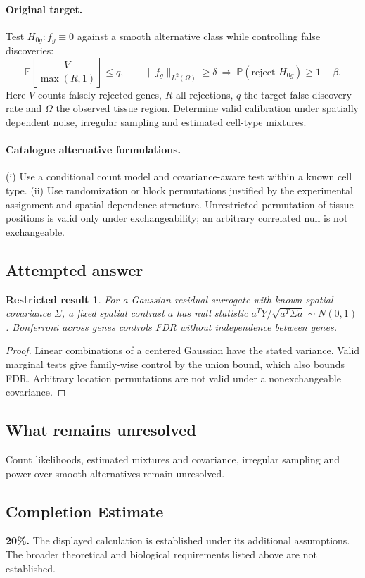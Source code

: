\documentclass[11pt]{article}
\newcommand{\E}{\mathbb E}
\newcommand{\Prob}{\mathbb P}
\providecommand{\E}{\mathbb E}
\providecommand{\Prob}{\mathbb P}
\newtheorem{attemptresult}{Restricted result}[section]
\begin{document}
\paragraph{Original target.}
Test $H_{0g}:f_g\equiv0$ against a smooth alternative class while controlling false discoveries:
\[\E\!\left[\frac{V}{\max(R,1)}\right]\le q,\qquad \|f_g\|_{L^2(\Omega)}\ge\delta\ \Longrightarrow\ \Prob(\text{reject }H_{0g})\ge1-\beta.\]
Here $V$ counts falsely rejected genes, $R$ all rejections, $q$ the target false-discovery rate and $\Omega$ the observed tissue region. Determine valid calibration under spatially dependent noise, irregular sampling and estimated cell-type mixtures.
\paragraph{Catalogue alternative formulations.}
(i) Use a conditional count model and covariance-aware test within a known cell type. (ii) Use randomization or block permutations justified by the experimental assignment and spatial dependence structure. Unrestricted permutation of tissue positions is valid only under exchangeability; an arbitrary correlated null is not exchangeable.
\subsection{Attempted answer}
\begin{attemptresult}
For a Gaussian residual surrogate with known spatial covariance $\Sigma$, a fixed spatial contrast $a$ has null statistic $a^TY/\sqrt{a^T\Sigma a}\sim N(0,1)$. Bonferroni across genes controls FDR without independence between genes.
\end{attemptresult}
\begin{proof}
Linear combinations of a centered Gaussian have the stated variance. Valid marginal tests give family-wise control by the union bound, which also bounds FDR. Arbitrary location permutations are not valid under a nonexchangeable covariance.
\end{proof}
\subsection{What remains unresolved}
Count likelihoods, estimated mixtures and covariance, irregular sampling and power over smooth alternatives remain unresolved.
\subsection{Completion Estimate}
\textbf{20\%.} The displayed calculation is established under its additional assumptions. The broader theoretical and biological requirements listed above are not established.
\end{document}
